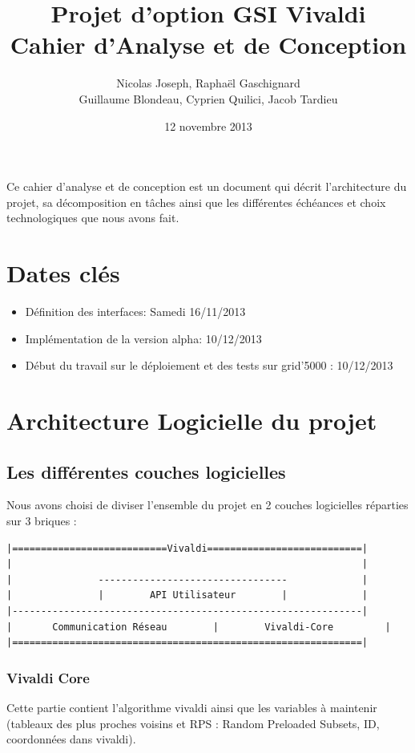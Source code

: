 \documentclass[11pt,a4paper]{article}
\title{Projet d'option GSI Vivaldi \\ Cahier d'Analyse et de Conception}
\author{Nicolas Joseph, Raphaël Gaschignard\\ Guillaume Blondeau, Cyprien Quilici, Jacob Tardieu}
\date{12 novembre 2013}
\begin{document}
\maketitle
Ce cahier d’analyse et de conception est un document qui décrit l’architecture du projet, sa décomposition en tâches ainsi que les différentes échéances et choix technologiques que nous avons fait.
\section{Dates clés}

\begin{itemize}
\item Définition des interfaces: Samedi 16/11/2013
\item Implémentation de la version alpha: 10/12/2013
\item Début du travail sur le déploiement et des tests sur grid’5000 : 10/12/2013
\end{itemize}

\section{Architecture Logicielle du projet}
\subsection{Les différentes couches logicielles} \label{coucheslogicielles}
Nous avons choisi de diviser l’ensemble du projet en 2 couches logicielles réparties sur 3 briques :

\begin{verbatim}
|===========================Vivaldi===========================|
|                                                             |
|               ---------------------------------             |
|               |        API Utilisateur        |             |
|-------------------------------------------------------------|
|     	Communication Réseau    	|        Vivaldi-Core         |
|=============================================================|
\end{verbatim}

\subsubsection{Vivaldi Core}
Cette partie contient l’algorithme vivaldi ainsi que les variables à maintenir (tableaux des plus proches voisins et RPS : Random Preloaded Subsets, ID, coordonnées dans vivaldi).\\
\end{document}

